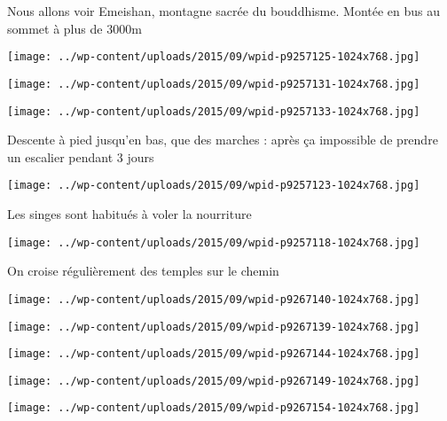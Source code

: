  Nous allons voir Emeishan, montagne sacrée du bouddhisme. Montée en bus au sommet à plus de 3000m \newline
 \newline
\centerline{\texttt{[image: ../wp-content/uploads/2015/09/wpid-p9257125-1024x768.jpg]} } 
 \newline
 \newline
\centerline{\texttt{[image: ../wp-content/uploads/2015/09/wpid-p9257131-1024x768.jpg]} } 
 \newline
 \newline
\centerline{\texttt{[image: ../wp-content/uploads/2015/09/wpid-p9257133-1024x768.jpg]} } 
 \newline
 Descente à pied jusqu'en bas, que des marches : après ça impossible de prendre un escalier pendant 3 jours \newline
 \newline
\centerline{\texttt{[image: ../wp-content/uploads/2015/09/wpid-p9257123-1024x768.jpg]} } 
 \newline
 Les singes sont habitués à voler la nourriture \newline
 \newline
\centerline{\texttt{[image: ../wp-content/uploads/2015/09/wpid-p9257118-1024x768.jpg]} } 
 \newline
 On croise régulièrement des temples sur le chemin \newline
 \newline
\centerline{\texttt{[image: ../wp-content/uploads/2015/09/wpid-p9267140-1024x768.jpg]} } 
 \newline
 \newline
\centerline{\texttt{[image: ../wp-content/uploads/2015/09/wpid-p9267139-1024x768.jpg]} } 
 \newline
 \newline
\centerline{\texttt{[image: ../wp-content/uploads/2015/09/wpid-p9267144-1024x768.jpg]} } 
 \newline
 \newline
\centerline{\texttt{[image: ../wp-content/uploads/2015/09/wpid-p9267149-1024x768.jpg]} } 
 \newline
 \newline
\centerline{\texttt{[image: ../wp-content/uploads/2015/09/wpid-p9267154-1024x768.jpg]} } 
 \newline
 \newline
